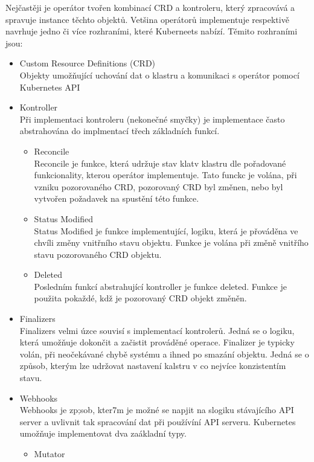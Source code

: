 Nejčastěji je operátor tvořen kombinací CRD a kontroleru, který zpracovává a spravuje instance těchto objektů. Vetšina operátorů implementuje respektivě navrhuje jedno či více rozhraními, které Kuberneets nabízí. Těmito rozhraními jsou:  
\begin{itemize}
    \item Custom Resource Definitions (CRD)\\
    Objekty umožňující uchování dat o klastru a komunikaci s operátor pomocí Kubernetes API
    \item Kontroller\\
    Při implementaci kontroleru (nekonečné smyčky) je implementace často abstrahována do implmentací třech základních funkcí.
    \begin{itemize}
        \item Reconcile\\
        Reconcile je funkce, která udržuje stav klatv klastru dle pořadované funkcionality, kterou operátor implementuje. Tato funckc je volána, při vzniku pozorovaného CRD, pozorovaný CRD byl změnen, nebo byl vytvořen požadavek na spustění této funkce. 
        \item Status Modified\\
        Status Modified je funkce implementující, logiku, která je přováděna ve chvíli změny vnitřního stavu objektu. Funkce je volána při změně vnitřího stavu pozorovaného CRD objektu.
        \item Deleted\\
        Posledním funkcí abstrahující kontroller je funkce deleted. Funkce je použita pokaždé, kdž je pozorovaný CRD objekt změněn.
    \end{itemize}
    \item Finalizers\\
    Finalizers velmi úzce souvisí s implementací kontrolerů. Jedná se o logiku, která umožňuje dokončit a začistit prováděné operace. Finalizer je typicky volán, při neočekávané chybě systému a ihned po smazání objektu. Jedná se o způsob, kterým lze udržovat nastavení kalstru v co nejvíce konzistentím stavu.
    \item Webhooks\\
    Webhooks je zp;sob, kter7m je možné se napjit na slogiku stávajícího API server a uvlivnit tak spracování dat při používíní API serveru. Kubernetes umožňuje implementovat dva zaákladní typy.
    \begin{itemize}
        \item Mutator\\

\end{itemize}
\end{itemize}
